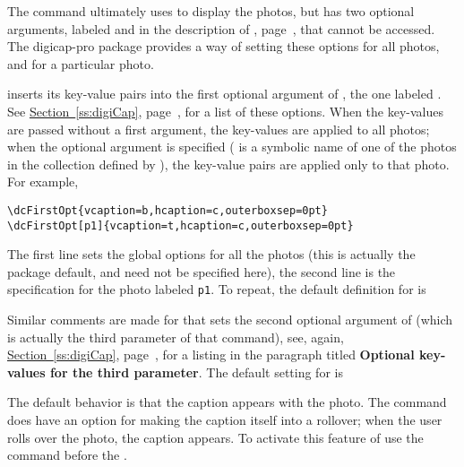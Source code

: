 \documentclass{article}
\begin{document}
The  command ultimately uses  to display the
photos, but  has two optional arguments, labeled 
and  in the description of ,
page~\pageref*{ss:digiCap}, that cannot be accessed. The \textsf{digicap-pro}
package provides a way of setting these options for all photos, and for a
particular photo.
\bVerb{}%
\begin{dCmd*}[commandchars=!()]{\bxSize}
\end{dCmd*}
\endgroup
\CmdDescription {} inserts its key-value pairs into the first optional argument
of , the one labeled . See
\hyperref[ss:digiCap]{Section~\ref*{ss:digiCap}}, page~\pageref*{ss:digiCap}, for a list of these
options. When the key-values are passed without a first argument, the key-values are applied to
all photos; when the optional argument is specified ( is a symbolic name of one of
the photos in the collection defined by ), the key-value pairs are applied only
to that photo. For example,
\begin{Verbatim}[xleftmargin=\parindent]
\dcFirstOpt{vcaption=b,hcaption=c,outerboxsep=0pt}
\dcFirstOpt[p1]{vcaption=t,hcaption=c,outerboxsep=0pt}
\end{Verbatim}
The first line sets the global options for all the photos (this is actually the package
default, and  need not be specified here), the second line is the specification for
the photo labeled \texttt{p1}. To repeat, the default definition for 
is
\bVerb{}%
\begin{dCmd}[commandchars=!()]{\bxSize}
\end{dCmd}
\eVerb Similar comments are made for  that sets the second
optional argument of  (which is actually the third parameter of
that command), see, again, \hyperref[ss:digiCap]{Section~\ref*{ss:digiCap}},
page~\pageref*{ss:digiCap}, for a listing in the paragraph titled
\textbf{Optional key-values for the third parameter}. The default setting for
 is
\bVerb{}%
\begin{dCmd}[commandchars=!()]{\bxSize}
\end{dCmd}
\eVerb
The default behavior is that the caption appears with the photo. The 
command does have an option for making the caption itself into a rollover; when the user
rolls over the photo, the caption appears. To activate this feature of 
use the command  before the .
\end{document}
